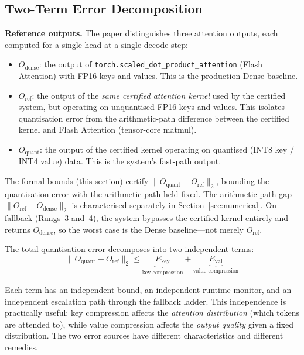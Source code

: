 \documentclass[11pt,a4paper]{article}
\theoremstyle{definition}
\theoremstyle{remark}
\newcommand{\norm}[1]{\lVert #1 \rVert}
\newcommand{\torchsdpa}{\texttt{torch.scaled\_dot\_\hspace{0pt}product\_attention}}
\begin{document}
\subsection{Two-Term Error Decomposition}
\label{sec:decomposition}

\textbf{Reference outputs.}  The paper distinguishes three attention outputs, each computed for a single head at a single decode step:

\begin{itemize}[leftmargin=2em,itemsep=2pt]
\item $O_{\mathrm{dense}}$: the output of \torchsdpa{} (Flash Attention) with FP16 keys and values.  This is the production Dense baseline.
\item $O_{\mathrm{ref}}$: the output of the \emph{same certified attention kernel} used by the certified system, but operating on unquantised FP16 keys and values.  This isolates quantisation error from the arithmetic-path difference between the certified kernel and Flash Attention (tensor-core matmul).
\item $O_{\mathrm{quant}}$: the output of the certified kernel operating on quantised (INT8 key / INT4 value) data.  This is the system's fast-path output.
\end{itemize}

The formal bounds (this section) certify $\norm{O_{\mathrm{quant}} - O_{\mathrm{ref}}}_2$, bounding the quantisation error with the arithmetic path held fixed.  The arithmetic-path gap $\norm{O_{\mathrm{ref}} - O_{\mathrm{dense}}}_2$ is characterised separately in Section~\ref{sec:numerical}.  On fallback (Rungs~3 and~4), the system bypasses the certified kernel entirely and returns $O_{\mathrm{dense}}$, so the worst case is the Dense baseline---not merely $O_{\mathrm{ref}}$.

The total quantisation error decomposes into two independent terms:
\begin{equation}
\label{eq:decomp}
  \norm{O_{\mathrm{quant}} - O_{\mathrm{ref}}}_2 \leq \underbrace{E_{\mathrm{key}}}_{\text{key compression}} + \underbrace{E_{\mathrm{val}}}_{\text{value compression}}
\end{equation}

Each term has an independent bound, an independent runtime monitor, and an independent escalation path through the fallback ladder.  This independence is practically useful: key compression affects the \emph{attention distribution} (which tokens are attended to), while value compression affects the \emph{output quality} given a fixed distribution.  The two error sources have different characteristics and different remedies.
\end{document}

